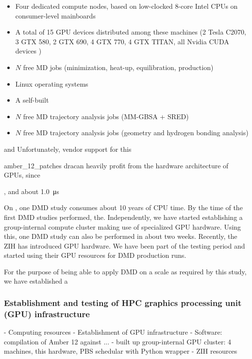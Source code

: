 \begin{itemize}
\item Four dedicated compute nodes, based on low-clocked 8-core Intel CPUs
on consumer-level mainboards
\item A total of 15 GPU devices distributed among these machines (2 Tesla C2070,
3 GTX 580, 2 GTX 690, 4 GTX 770, 4 GTX TITAN, all Nvidia CUDA devices
\cite{nvidia_cuda_devices})
\item $N$ free MD jobs (minimization, heat-up, equilibration, production)
\item Linux operating systems
\item A self-built
\item $N$ free MD trajectory analysis jobs (MM-GBSA + SRED)
\item $N$ free MD trajectory analysis jobs (geometry and hydrogen bonding
analysis)
\end{itemize}



and Unfortunately, vendor support for this


amber_12_patches
dracan heavily profit from the hardware architecture of GPUs, since







, and about
\SI{1.0}{\micro\second}


On , one DMD study consumes about 10 years of CPU time.
By the time of the first DMD studies performed, the. Independently, we have started
establishing a group-internal compute cluster making use of specialized GPU
hardware. Using this, one DMD study can also be performed in about two weeks.
Recently, the ZIH has introduced GPU hardware. We have been part of the testing
period and started using their GPU resources for DMD production runs.

For the purpose of being able to apply DMD on a scale as required by this study,
we have established a


\subsubsection{Establishment and testing of HPC graphics processing unit (GPU) infrastructure}



        - Computing resources
            - Establishment of GPU infrastructure
                - Software: compilation of Amber 12 against ...
                - built up group-internal GPU cluster:
                    4 machines, this hardware, PBS schedular with Python wrapper
                - ZIH resources

